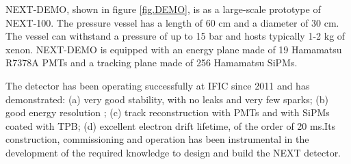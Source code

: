 NEXT-DEMO, shown in figure \ref{fig.DEMO}, is as a large-scale prototype of NEXT-100. The pressure vessel has a length of 60 cm and a diameter of 30 cm. The vessel can withstand a pressure of up to 15 bar and hosts typically 1-2 kg of xenon. NEXT-DEMO is  equipped with an energy plane made of 19 Hamamatsu R7378A PMTs and a tracking plane made of 256 Hamamatsu SiPMs. 

The detector has been operating successfully at IFIC since 2011 and has demonstrated: (a) very good stability, with no leaks and very few sparks; (b) good energy resolution ; (c) track reconstruction with PMTs and with SiPMs coated with TPB; (d) excellent electron drift lifetime, of the order of 20 ms.Its construction, commissioning and operation has been instrumental in the development of the required knowledge to design and build the NEXT detector.


%




